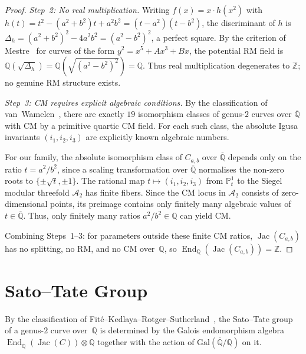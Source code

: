 \documentclass[11pt,a4paper]{article}
\newcommand{\Jac}{\operatorname{Jac}}
\newcommand{\End}{\operatorname{End}}
\newcommand{\Qbar}{\overline{\mathbb{Q}}}
\theoremstyle{definition}
\theoremstyle{remark}
\begin{document}
\begin{proof}
  \medskip
  \noindent\emph{Step~2: No real multiplication.}
  Writing $f(x) = x \cdot h(x^2)$ with
  $h(t) = t^2 - (a^2 + b^2)t + a^2 b^2 = (t - a^2)(t - b^2)$,
  the discriminant of $h$ is
  $\Delta_h = (a^2 + b^2)^2 - 4a^2 b^2 = (a^2 - b^2)^2$, a perfect
  square.
  By the criterion of Mestre~\cite{Mestre} for curves of the form
  $y^2 = x^5 + Ax^3 + Bx$, the potential RM field is
  $\mathbb{Q}(\sqrt{\Delta_h}) = \mathbb{Q}(\sqrt{(a^2 - b^2)^2}) = \mathbb{Q}$.
  Thus real multiplication degenerates to $\mathbb{Z}$; no genuine
  RM structure exists.

  \medskip
  \noindent\emph{Step~3: CM requires explicit algebraic conditions.}
  By the classification of van~Wamelen~\cite{vanWamelen}, there
  are exactly $19$ isomorphism classes of genus-$2$ curves over
  $\Qbar$ with CM by a primitive quartic CM field.
  For each such class, the absolute Igusa invariants
  $(i_1, i_2, i_3)$ are explicitly known algebraic numbers.

  For our family, the absolute isomorphism class of $C_{a,b}$
  over $\overline{\mathbb{Q}}$ depends only on the ratio
  $t = a^2/b^2$, since a scaling transformation over $\overline{\mathbb{Q}}$
  normalises the non-zero roots to $\{ \pm\sqrt{t}, \pm 1 \}$.
  The rational map $t \mapsto (i_1, i_2, i_3)$ from $\mathbb{P}^1_t$
  to the Siegel modular threefold $\mathcal{A}_2$ has finite fibers.
  Since the CM locus in $\mathcal{A}_2$ consists of zero-dimensional
  points, its preimage contains only finitely many algebraic values
  of $t \in \overline{\mathbb{Q}}$.
  Thus, only finitely many ratios $a^2/b^2 \in \mathbb{Q}$ can
  yield CM.

  Combining Steps~1--3: for parameters outside these finite
  CM ratios, $\Jac(C_{a,b})$ has no splitting, no RM, and no CM
  over~$\mathbb{Q}$, so $\End_{\mathbb{Q}}(\Jac(C_{a,b})) = \mathbb{Z}$.
\end{proof}


\section{Sato--Tate Group}\label{sec:ST}

By the classification of Fit\'e--Kedlaya--Rotger--Sutherland~\cite{FKRS},
the Sato--Tate group of a genus-$2$ curve over~$\mathbb{Q}$ is
determined by the Galois endomorphism algebra
$\End_{\Qbar}(\Jac(C)) \otimes \mathbb{Q}$ together with the
action of $\mathrm{Gal}(\Qbar/\mathbb{Q})$ on it.
\end{document}
